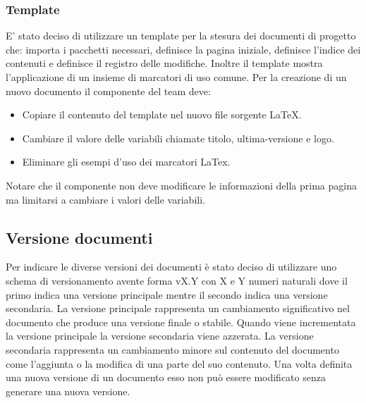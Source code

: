 \documentclass[a4paper, 12pt]{article}
\begin{document}
    \subsubsection{Template}
    E’ stato deciso di utilizzare un template per la stesura dei documenti di progetto che: importa i pacchetti necessari, definisce la pagina iniziale, definisce l’indice dei contenuti e definisce il registro delle modifiche. 
    Inoltre il template mostra l’applicazione di un insieme di marcatori di uso comune.
    Per la creazione di un nuovo documento il componente del team deve:
    \begin{itemize}
        \item Copiare il contenuto del template nel nuovo file sorgente LaTeX.
        \item Cambiare il valore delle variabili chiamate titolo, ultima-versione e logo.
        \item Eliminare gli esempi d'uso dei marcatori LaTex.
    \end{itemize}
    Notare che il componente non deve modificare le informazioni della prima pagina ma limitarsi a cambiare i valori delle variabili.

    \subsection{Versione documenti}
    Per indicare le diverse versioni dei documenti è stato deciso di utilizzare uno schema di versionamento avente forma vX.Y con X e Y numeri naturali dove il primo indica una versione principale mentre il secondo indica una versione secondaria.
    La versione principale rappresenta un cambiamento significativo nel documento che produce una versione finale o stabile.
    Quando viene incrementata la versione principale la versione secondaria viene azzerata.
    La versione secondaria rappresenta un cambiamento minore sul contenuto del documento come l’aggiunta o la modifica di una parte del suo contenuto.
    Una volta definita una nuova versione di un documento esso non può essere modificato senza generare una nuova versione.
\end{document}
